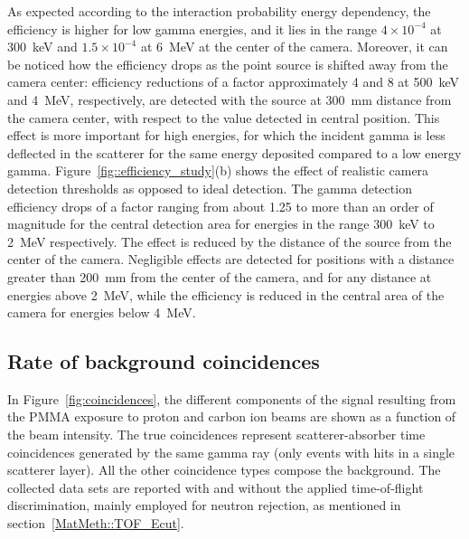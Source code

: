 As expected according to the interaction probability energy dependency, the efficiency is higher for low gamma energies, and it lies in the range $4\times10^{-4}$ at 300~keV and $1.5\times10^{-4}$ at 6~MeV at the center of the camera. Moreover, it can be noticed how the efficiency drops as the point source is shifted away from the camera center: efficiency reductions of a factor approximately 4 and 8 at 500~keV and 4~MeV, respectively, are detected with the source at 300~mm distance from the camera center, with respect to the value detected in central position. This effect is more important for high energies, for which the incident gamma is less deflected in the scatterer for the same energy deposited compared to a low energy gamma.   
Figure~\ref{fig::efficiency_study}(b) shows the effect of realistic camera detection thresholds as opposed to ideal detection. The gamma detection efficiency drops of a factor ranging from about 1.25 to more than an order of magnitude for the central detection area for energies in the range 300~keV to 2~MeV respectively. The effect is reduced by the distance of the source from the center of the camera. Negligible effects are detected for positions with a distance greater than 200~mm from the center of the camera, and for any distance at energies above 2~MeV, while the efficiency is reduced in the central area of the camera for energies below 4~MeV.\\
 
\subsection{Rate of background coincidences}
\label{Results::beamInt}
 
In Figure~\ref{fig:coincidences}, the different components of the signal resulting from the PMMA exposure to proton and carbon ion beams are shown as a function of the beam intensity. The true coincidences represent scatterer-absorber time coincidences generated by the same gamma ray (only events with hits in a single scatterer layer). All the other coincidence types compose the background. The collected data sets are reported with and without the applied time-of-flight discrimination, mainly employed for neutron rejection, as mentioned in section~\ref{MatMeth::TOF_Ecut}.

